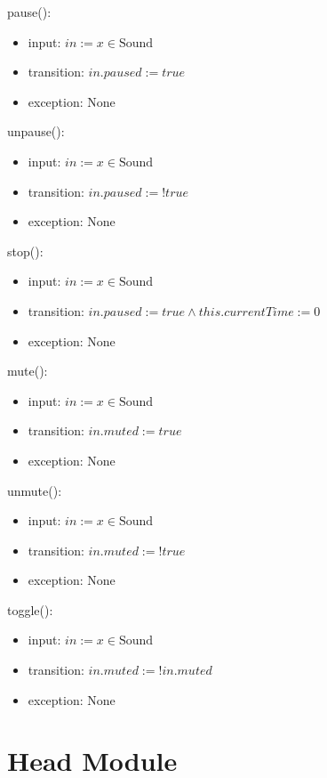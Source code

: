 \documentclass[12pt]{article}
\begin{document}
\noindent pause():
\begin{itemize}
  \item input: $in := x \in \mbox{Sound}$
  \item transition: $in.paused := true$
  \item exception: None
\end{itemize}

\noindent unpause():
\begin{itemize}
  \item input: $in := x \in \mbox{Sound}$
  \item transition: $in.paused := !true$
  \item exception: None
\end{itemize}

\noindent stop():
\begin{itemize}
  \item input: $in := x \in \mbox{Sound}$
  \item transition: $in.paused := true \land this.currentTime := 0$
  \item exception: None
\end{itemize}

\noindent mute():
\begin{itemize}
  \item input: $in := x \in \mbox{Sound}$
  \item transition: $in.muted := true$
  \item exception: None
\end{itemize}

\noindent unmute():
\begin{itemize}
  \item input: $in := x \in \mbox{Sound}$
  \item transition: $in.muted := !true$
  \item exception: None
\end{itemize}

\noindent toggle():
\begin{itemize}
  \item input: $in := x \in \mbox{Sound}$
  \item transition: $in.muted := !in.muted$
  \item exception: None
\end{itemize}

\newpage

\section*{Head Module}
\end{document}
